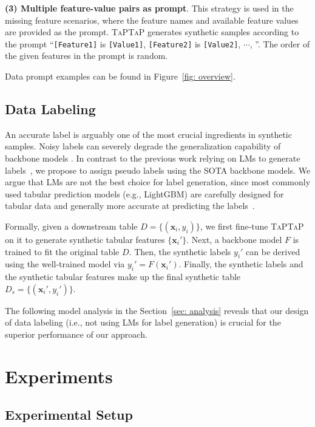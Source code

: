 \textbf{(3) Multiple feature-value pairs as prompt}. This strategy is used in the missing feature scenarios, where the feature names and available feature values are provided as the prompt. \textsc{TaPTaP} generates synthetic samples according to the prompt ``\texttt{[Feature1]} is \texttt{[Value1]}, \texttt{[Feature2]} is \texttt{[Value2]}, $\cdots$, ''. The order of the given features in the prompt is random.

Data prompt examples can be found in Figure~\ref{fig: overview}.

\subsection{Data Labeling}

An accurate label is arguably one of the most crucial ingredients in synthetic samples. Noisy labels can severely degrade the generalization capability of backbone models \citep{revisiting}. In contrast to the previous work relying on LMs to generate labels~\citep{GReaT}, we propose to assign pseudo labels using the SOTA backbone models. We argue that LMs are not the best choice for label generation, since most commonly used tabular prediction models (e.g., LightGBM) are carefully designed for tabular data and generally more accurate at predicting the labels~\citep{tabllm,deeplearning-not}.

Formally, given a downstream table $D\!\!=\!\!\{(\mathbf{x}_i,y_i)\}$, we first fine-tune \textsc{TaPTaP} on it to generate synthetic tabular features $\{\mathbf{x}_i'\}$.
Next, a backbone model $F$ is trained to fit the original table $D$. Then, the synthetic labels $y_i'$ can be derived using the well-trained model via $y_i'\!=\!F(\mathbf{x}_i')$.
Finally, the synthetic labels and the synthetic tabular features make up the final synthetic table $D_s\!=\!\{(\mathbf{x}_i',y_i')\}$.

The following model analysis in the Section~\ref{sec: analysis} reveals that our design of data labeling (i.e., not using LMs for label generation) is crucial for the superior performance of our approach.

\section{Experiments}
\subsection{Experimental Setup}

